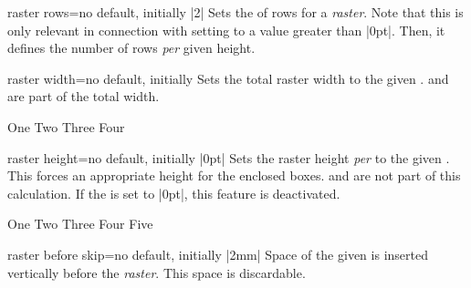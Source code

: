 \begin{docTcbKey}[][doc new=2014-11-10]{raster rows}{=}{no default, initially |2|}
  Sets the  of rows for a \emph{raster}.
  Note that this is only relevant in connection with setting 
  to a value greater than |0pt|. Then, it defines the number of rows \emph{per} given
  height.
\end{docTcbKey}


\begin{docTcbKey}[][doc new=2014-11-10]{raster width}{=}{no default, initially }
  Sets the total raster width to the given .
   and  are part
  of the total width.
\begin{dispExample}
\begin{tcbitemize}[raster width=\linewidth/2,
  size=small,colframe=red!50!black,colback=red!10!white]
  \tcbitem One
  \tcbitem Two
  \tcbitem Three
  \tcbitem Four
\end{tcbitemize}
\end{dispExample}
\end{docTcbKey}


\clearpage
\begin{docTcbKey}[][doc new=2014-11-10]{raster height}{=}{no default, initially |0pt|}
  Sets the raster height \emph{per}  to the given .
  This forces an appropriate height for the enclosed boxes.
   and 
  are not part of this calculation.
  If the  is set to |0pt|, this feature is deactivated.
\begin{dispExample}
\begin{tcbitemize}[raster height=4cm, raster rows=2,
  size=small,colframe=red!50!black,colback=red!10!white]
  \tcbitem One
  \tcbitem Two
  \tcbitem[enhanced,
    finish={\draw[blue,very thick,<->] (frame.south)
      -- node[right,pos=.75]{4cm} +(0,4); }]
    Three
  \tcbitem Four
  \tcbitem Five
\end{tcbitemize}
\end{dispExample}
\end{docTcbKey}


\begin{docTcbKey}[][doc new and updated={2014-11-10}{2014-12-16}]{raster before skip}{=}{no default, initially |2mm|}
  Space of the given  is inserted vertically before the \emph{raster}.
  This space is discardable.
\end{docTcbKey}

